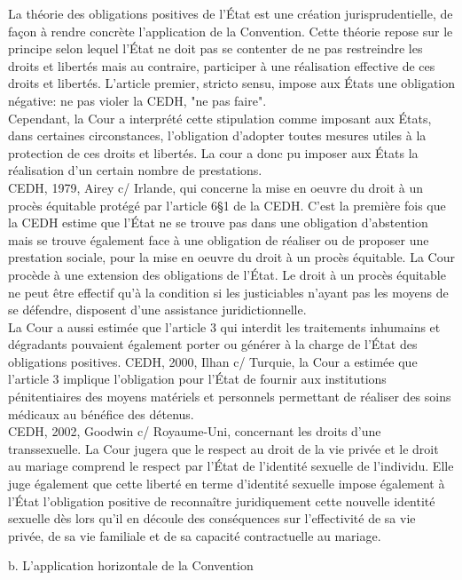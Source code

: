 \documentclass[10pt, a4paper, openany]{book}
\begin{document}
La théorie des obligations positives de l'État est une création jurisprudentielle, de façon à rendre concrète l'application de la Convention. Cette théorie repose sur le principe selon lequel l'État ne doit pas se contenter de ne pas restreindre les droits et libertés mais au contraire, participer à une réalisation effective de ces droits et libertés. L'article premier, stricto sensu, impose aux États une obligation négative: ne pas violer la CEDH, "ne pas faire". \\
Cependant, la Cour a interprété cette stipulation comme imposant aux États, dans certaines circonstances, l'obligation d'adopter toutes mesures utiles à la protection de ces droits et libertés. La cour a donc pu imposer aux États la réalisation d'un certain nombre de prestations. \\
CEDH, 1979, Airey c/ Irlande, qui concerne la mise en oeuvre du droit à un procès équitable protégé par l'article 6§1 de la CEDH. C'est la première fois que la CEDH estime que l'État ne se trouve pas dans une obligation d'abstention mais se trouve également face à une obligation de réaliser ou de proposer une prestation sociale, pour la mise en oeuvre du droit à un procès équitable. La Cour procède à une extension des obligations de l'État. Le droit à un procès équitable ne peut être effectif qu'à la condition si les justiciables n'ayant pas les moyens de se défendre, disposent d'une assistance juridictionnelle. \\
La Cour a aussi estimée que l'article 3 qui interdit les traitements inhumains et dégradants pouvaient également porter ou générer à la charge de l'État des obligations positives. CEDH, 2000, Ilhan c/ Turquie, la Cour a estimée que l'article 3 implique l'obligation pour l'État de fournir aux institutions pénitentiaires des moyens matériels et personnels permettant de réaliser des soins médicaux au bénéfice des détenus. \\
CEDH, 2002, Goodwin c/ Royaume-Uni, concernant les droits d'une transsexuelle. La Cour jugera que le respect au droit de la vie privée et le droit au mariage comprend le respect par l'État de l'identité sexuelle de l'individu. Elle juge également que cette liberté en terme d'identité sexuelle impose également à l'État l'obligation positive de reconnaître juridiquement cette nouvelle identité sexuelle dès lors qu'il en découle des conséquences sur l'effectivité de sa vie privée, de sa vie familiale et de sa capacité contractuelle au mariage. 


b. L'application horizontale de la Convention
\end{document}
